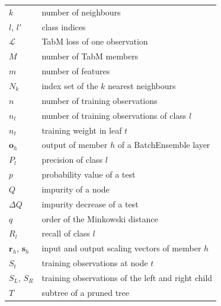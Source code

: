 \documentclass[conference]{IEEEtran}
\begin{document}
\begin{tabular}{@{}ll@{}}
    $k$                            & number of neighbours                             \\
    $l$, $l'$                      & class indices                                    \\
    $\mathcal{L}$                  & TabM loss of one observation                             \\
    $M$                            & number of TabM members                           \\
    $m$                            & number of features                               \\
    $N_k$                          & index set of the $k$ nearest neighbours          \\
    $n$                            & number of training observations                          \\
    $n_l$                          & number of training observations of class $l$             \\
    $n_t$                          & training weight in leaf $t$                      \\
    $\mathbf{o}_h$                 & output of member $h$ of a BatchEnsemble layer    \\
    $P_l$                          & precision of class $l$                           \\
    $p$                            & probability value of a test                      \\
    $Q$                            & impurity of a node                               \\
    $\Delta Q$                     & impurity decrease of a test                      \\
    $q$                            & order of the Minkowski distance                  \\
    $R_l$                          & recall of class $l$                              \\
    $\mathbf{r}_h$, $\mathbf{s}_h$ & input and output scaling vectors of member $h$   \\
    $S_t$                          & training observations at node $t$                        \\
    $S_L$, $S_R$                   & training observations of the left and right child        \\
    $T$                            & subtree of a pruned tree                         \\

\end{tabular}
\end{document}
